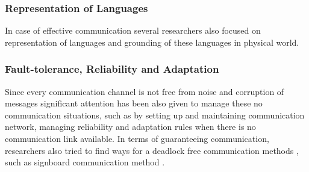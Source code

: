 \subsubsection*{Representation of Languages}
In case of effective communication several researchers also focused on representation of languages and grounding of these languages in physical world.

\subsubsection*{Fault-tolerance, Reliability and Adaptation}  
Since every communication channel is not free from noise and corruption of messages significant attention has been also given to manage these no communication situations, such as by setting up and maintaining communication network, managing reliability and adaptation rules when there is no communication link available. In terms of guaranteeing communication, researchers also tried to find ways for a deadlock free communication methods \cite{Arkin1998}, such as signboard communication method \cite{Wang1989}.

